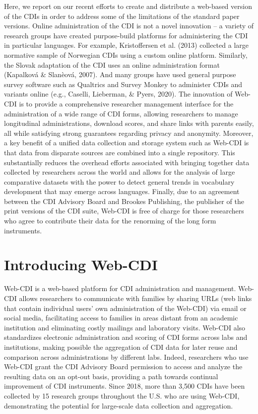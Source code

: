 \documentclass[
  english,
  ,man,floatsintext]{apa6}
\begin{document}
Here, we report on our recent efforts to create and distribute a web-based version of the CDIs in order to address some of the limitations of the standard paper versions. Online administration of the CDI is not a novel innovation -- a variety of research groups have created purpose-build platforms for administering the CDI in particular languages. For example, Kristoffersen et al. (2013) collected a large normative sample of Norwegian CDIs using a custom online platform. Similarly, the Slovak adaptation of the CDI uses an online administration format (Kapalková \& Slanèová, 2007). And many groups have used general purpose survey software such as Qualtrics and Survey Monkey to administer CDIs and variants online (e.g., Caselli, Lieberman, \& Pyers, 2020). The innovation of Web-CDI is to provide a comprehensive researcher management interface for the administration of a wide range of CDI forms, allowing researchers to manage longitudinal administrations, download scores, and share links with parents easily, all while satisfying strong guarantees regarding privacy and anonymity. Moreover, a key benefit of a unified data collection and storage system such as Web-CDI is that data from disparate sources are combined into a single repository. This substantially reduces the overhead efforts associated with bringing together data collected by researchers across the world and allows for the analysis of large comparative datasets with the power to detect general trends in vocabulary development that may emerge across languages. Finally, due to an agreement between the CDI Advisory Board and Brookes Publishing, the publisher of the print versions of the CDI suite, Web-CDI is free of charge for those researchers who agree to contribute their data for the renorming of the long form instruments.

\hypertarget{introducing-web-cdi}{%
\section{Introducing Web-CDI}\label{introducing-web-cdi}}

Web-CDI is a web-based platform for CDI administration and management. Web-CDI allows researchers to communicate with families by sharing URLs (web links that contain individual users' own administration of the Web-CDI) via email or social media, facilitating access to families in areas distant from an academic institution and eliminating costly mailings and laboratory visits. Web-CDI also standardizes electronic administration and scoring of CDI forms across labs and institutions, making possible the aggregation of CDI data for later reuse and comparison across administrations by different labs. Indeed, researchers who use Web-CDI grant the CDI Advisory Board permission to access and analyze the resulting data on an opt-out basis, providing a path towards continual improvement of CDI instruments. Since 2018, more than 3,500 CDIs have been collected by 15 research groups throughout the U.S. who are using Web-CDI, demonstrating the potential for large-scale data collection and aggregation.
\end{document}
